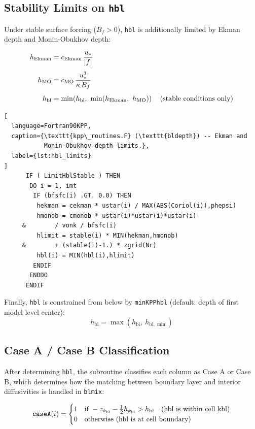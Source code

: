 \documentclass[12pt,letterpaper]{article}
\newcommand{\hbl}{h_{\mathrm{bl}}}
\newcommand{\ustar}{u_*}
\begin{document}
\subsection{Stability Limits on \texttt{hbl}}  
  
Under stable surface forcing ($B_f > 0$), \texttt{hbl} is additionally  
limited by Ekman depth and Monin-Obukhov depth:  
  
\begin{align}  
h_{\rm Ekman} &= c_{\rm Ekman}\,\frac{\ustar}{|f|} \\[4pt]  
h_{\rm MO} &= c_{\rm MO}\,\frac{\ustar^3}{\kappa\,B_f} \\[4pt]  
\hbl &= \min\!\left(\hbl,\ \min(h_{\rm Ekman},\ h_{\rm MO})\right)  
\quad \text{(stable conditions only)}  
\end{align}  
  
\begin{lstlisting}[  
  language=Fortran90KPP,  
  caption={\texttt{kpp\_routines.F} (\texttt{bldepth}) -- Ekman and  
           Monin-Obukhov depth limits.},  
  label={lst:hbl_limits}  
]  
      IF ( LimitHblStable ) THEN  
       DO i = 1, imt  
        IF (bfsfc(i) .GT. 0.0) THEN  
         hekman = cekman * ustar(i) / MAX(ABS(Coriol(i)),phepsi)  
         hmonob = cmonob * ustar(i)*ustar(i)*ustar(i)  
     &        / vonk / bfsfc(i)  
         hlimit = stable(i) * MIN(hekman,hmonob)  
     &        + (stable(i)-1.) * zgrid(Nr)  
         hbl(i) = MIN(hbl(i),hlimit)  
        ENDIF  
       ENDDO  
      ENDIF  
\end{lstlisting}  
  
Finally, \texttt{hbl} is constrained from below by \texttt{minKPPhbl}  
(default: depth of first model level center):  
\begin{equation}  
\hbl = \max(\hbl,\ h_{\mathrm{bl},\min})  
\end{equation}  
  
\subsection{Case A / Case B Classification}  
  
After determining \texttt{hbl}, the subroutine classifies each column  
as Case A or Case B, which determines how the matching between boundary  
layer and interior diffusivities is handled in \texttt{blmix}:  
  
\begin{equation}  
\texttt{caseA}(i) = \begin{cases}  
1 & \text{if } -z_{k_{\rm bl}} - \tfrac{1}{2}h_{k_{\rm bl}} > \hbl  
    \quad \text{(hbl is within cell kbl)} \\  
0 & \text{otherwise (hbl is at cell boundary)}  
\end{cases}  
\end{equation}  
  
\end{document}
